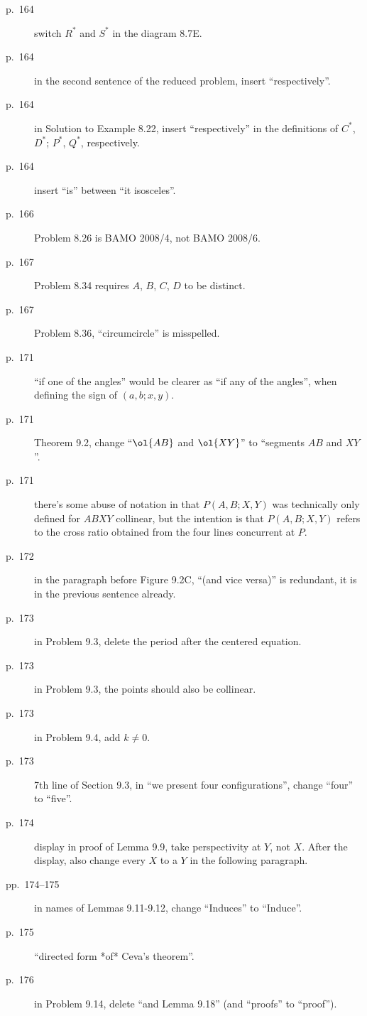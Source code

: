 \documentclass[11pt]{scrartcl}
\begin{document}
\begin{description}
\item[p.\  164] switch $R^\ast$ and $S^\ast$ in the diagram 8.7E.
\item[p.\  164] in the second sentence of the reduced problem, insert ``respectively''.
\item[p.\  164] in Solution to Example 8.22, insert ``respectively''
  in the definitions of $C^\ast$, $D^\ast$; $P^\ast$, $Q^\ast$, respectively.
\item[p.\  164] insert ``is'' between ``it isosceles''.
\item[p.\  166] Problem 8.26 is BAMO 2008/4, not BAMO 2008/6.
\item[p.\  167] Problem 8.34 requires $A$, $B$, $C$, $D$ to be distinct.
\item[p.\  167] Problem 8.36, ``circumcircle'' is misspelled.
\item[p.\  171] ``if one of the angles'' would be clearer as ``if any of the
  angles'', when defining the sign of $(a,b;x,y)$.
\item[p.\  171] Theorem 9.2, change ``$\ol{AB}$ and $\ol{XY}$'' to ``segments $AB$ and $XY$''.
\item[p.\  171] there's some abuse of notation in that $P(A,B;X,Y)$
  was technically only defined for $ABXY$ collinear,
  but the intention is that $P(A,B;X,Y)$ refers to the cross ratio obtained
  from the four lines concurrent at $P$.
\item[p.\  172] in the paragraph before Figure 9.2C,
  ``(and vice versa)'' is redundant, it is in the previous sentence already.
\item[p.\  173] in Problem 9.3, delete the period after the centered equation.
\item[p.\  173] in Problem 9.3, the points should also be collinear.
\item[p.\  173] in Problem 9.4, add $k \neq 0$.
\item[p.\  173] 7th line of Section 9.3, in ``we present four configurations'',
  change ``four'' to ``five''.
\item[p.\  174] display in proof of Lemma 9.9, take perspectivity at $Y$, not $X$.
  After the display, also change every $X$ to a $Y$ in the following paragraph.
\item[pp.\  174--175] in names of Lemmas 9.11-9.12,
  change ``Induces'' to ``Induce''.
\item[p.\  175] ``directed form *of* Ceva's theorem''.
\item[p.\  176] in Problem 9.14, delete ``and Lemma 9.18'' (and ``proofs'' to ``proof'').

\end{description}
\end{document}
